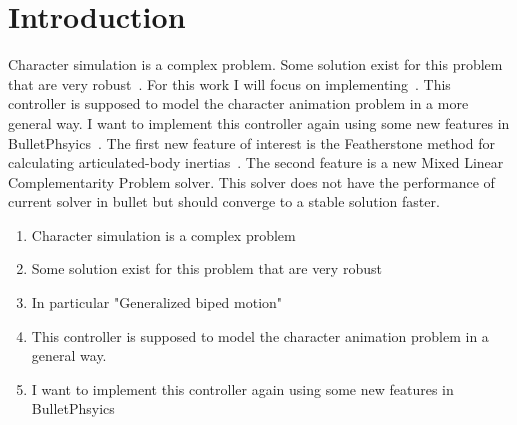 
\section{Introduction}
\label{sec:Intro}


Character simulation is a complex problem.
Some solution exist for this problem that are very robust~\cite{Yin07,Coros09}.
For this work I will focus on implementing~\cite{2010-TOG-gbwc}.
This controller is supposed to model the character animation problem in a more general way.
I want to implement this controller again using some new features in BulletPhsyics~\cite{coumans2013bullet}.
The first new feature of interest is the Featherstone method for calculating articulated-body inertias~\cite{featherstone2014rigid}. 
The second feature is a new Mixed Linear Complementarity Problem solver. This solver does not have the performance of current solver in bullet but should converge to a stable solution faster.

\begin{enumerate}
	\item {Character simulation is a complex problem}
	\item {Some solution exist for this problem that are very robust}
	\item {In particular "Generalized biped motion"}
	\item {This controller is supposed to model the character animation problem in a general way.}
	\item {I want to implement this controller again using some new features in BulletPhsyics}
\end{enumerate}
